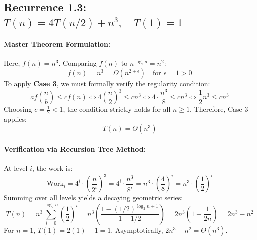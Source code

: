\documentclass[12pt,a4paper]{article}
\theoremstyle{plain}
\theoremstyle{definition}
\theoremstyle{remark}
\begin{document}
\subsection{Recurrence 1.3: \texorpdfstring{$T(n) = 4 T(n/2) + n^3, \quad T(1) = 1$}{T(n) = 4T(n/2) + n\textasciicircum 3, T(1) = 1}}

\paragraph{Master Theorem Formulation:}
Here, $f(n) = n^3$. Comparing $f(n)$ to $n^{\log_b a} = n^2$:
\begin{equation}
f(n) = n^3 = \Omega\left(n^{2 + \epsilon}\right) \quad \text{for } \epsilon = 1 > 0
\end{equation}
To apply \textbf{Case 3}, we must formally verify the regularity condition:
\begin{equation}
a f\left(\frac{n}{b}\right) \le c f(n) \iff 4 \left(\frac{n}{2}\right)^3 \le c n^3 \iff 4 \cdot \frac{n^3}{8} \le c n^3 \iff \frac{1}{2} n^3 \le c n^3
\end{equation}
Choosing $c = \frac{1}{2} < 1$, the condition strictly holds for all $n \ge 1$. Therefore, Case 3 applies:
\begin{equation}
\boxed{T(n) = \Theta\left(n^3\right)}
\end{equation}

\paragraph{Verification via Recursion Tree Method:}
At level $i$, the work is:
\begin{equation}
\text{Work}_i = 4^i \cdot \left(\frac{n}{2^i}\right)^3 = 4^i \cdot \frac{n^3}{8^i} = n^3 \cdot \left(\frac{4}{8}\right)^i = n^3 \cdot \left(\frac{1}{2}\right)^i
\end{equation}
Summing over all levels yields a decaying geometric series:
\begin{equation}
T(n) = n^3 \sum_{i=0}^{\log_2 n} \left(\frac{1}{2}\right)^i = n^3 \left(\frac{1 - (1/2)^{\log_2 n + 1}}{1 - 1/2}\right) = 2 n^3 \left(1 - \frac{1}{2n}\right) = 2 n^3 - n^2
\end{equation}
For $n = 1$, $T(1) = 2(1) - 1 = 1$. Asymptotically, $2 n^3 - n^2 = \Theta(n^3)$.
\end{document}

